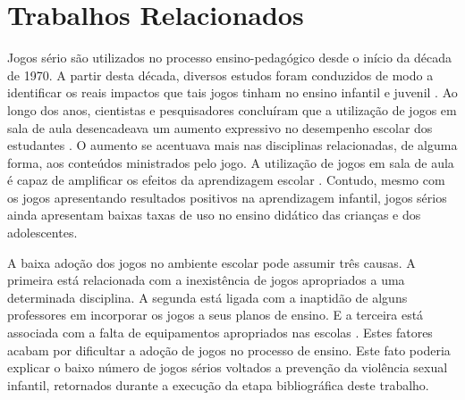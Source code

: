 



\chapter{Trabalhos Relacionados}\label{ssec:JS}

Jogos sério são utilizados no processo ensino-pedagógico desde o início da década de 1970. A partir desta década, diversos estudos foram conduzidos de modo a identificar os reais impactos que tais jogos tinham no ensino infantil e juvenil \cite{stieler2016paper}. Ao longo dos anos, cientistas e pesquisadores concluíram que a utilização de jogos em sala de aula desencadeava um aumento expressivo no desempenho escolar dos estudantes \cite{wentzel1998social}. O aumento se acentuava mais nas disciplinas relacionadas, de alguma forma, aos conteúdos ministrados pelo jogo. A utilização de jogos em sala de aula é capaz de amplificar os efeitos da aprendizagem escolar \cite{jones2020serious}. Contudo, mesmo com os jogos apresentando resultados positivos na aprendizagem infantil, jogos sérios ainda apresentam baixas taxas de uso no ensino didático das crianças e dos adolescentes. 

A baixa adoção dos jogos no ambiente escolar pode assumir três causas. A primeira está relacionada com a inexistência de jogos apropriados a uma determinada disciplina. A segunda está ligada com a inaptidão de alguns professores em incorporar os jogos a seus planos de ensino. E a terceira está associada com a falta de equipamentos apropriados nas escolas \cite{dip2016advancing}. Estes fatores acabam por dificultar a adoção de jogos no processo de ensino. Este fato poderia explicar o baixo número de jogos sérios voltados a prevenção da violência sexual infantil, retornados durante a execução da etapa bibliográfica deste trabalho. 

